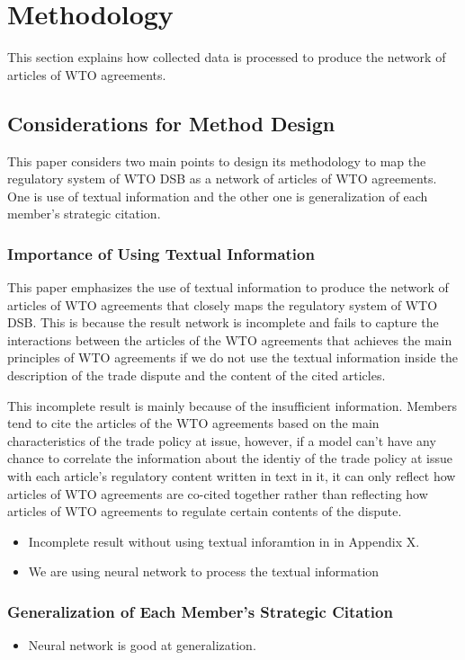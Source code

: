 \documentclass[12pt,letterpaper]{article}
\begin{document}
\section{Methodology}
This section explains 
how collected data is processed
to produce the network of articles of WTO agreements.

\subsection{Considerations for Method Design}
This paper considers two main points to
design its methodology to map the regulatory system of WTO DSB
as a network of articles of WTO agreements. 
One is use of textual information and the other one is
generalization of each member's strategic citation.

\subsubsection{Importance of Using Textual Information}

This paper emphasizes the use of textual information 
to produce the network of articles of WTO agreements
that closely maps the regulatory system of WTO DSB. 
This is because the result network is incomplete 
and fails to capture the interactions between the articles of the WTO agreements
that achieves the main principles of WTO agreements 
if we do not use
the textual information inside the description of the trade dispute and 
the content of the cited articles. 

This incomplete result is mainly because
of the insufficient information. Members tend to cite the articles of 
the WTO agreements based on the main characteristics of 
the trade policy at issue, however, if a model 
can't have any chance to correlate the information
about the identiy of the trade policy at issue with 
each article's regulatory content written in text in it,
it can only reflect how articles of WTO agreements are co-cited 
together rather than reflecting how articles of WTO agreements 
to regulate certain contents of the dispute. 
\begin{itemize}
  \item Incomplete result without using textual inforamtion in in Appendix X.
  \item We are using neural network to process the textual information
\end{itemize}

\subsubsection{Generalization of Each Member's Strategic Citation}
\begin{itemize}
  \item Neural network is good at generalization.
\end{itemize}
\end{document}
